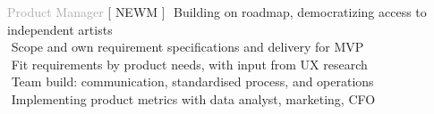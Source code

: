
    
\begin{cvtable}


{\textcolor{darkgray}{Product Manager}}%
{[ {N\scriptsize EWM} ]}%
{%
     \textperiodcentered $ $ Building on roadmap, democratizing access to independent artists \\
     \textperiodcentered $ $ Scope and own requirement specifications and delivery for MVP \\
     \textperiodcentered $ $ Fit requirements by product needs, with input from UX research \\
     \textperiodcentered $ $ Team build: communication, standardised process, and operations \\
     \textperiodcentered $ $ Implementing product metrics with data analyst, marketing, CFO \\
}




\end{cvtable}

